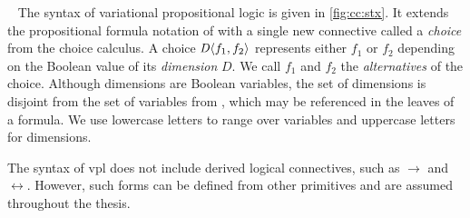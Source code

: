 ~\label{section:vpl:syntax}
%
The syntax of variational propositional logic is given in
\autoref{fig:cc:stx}. It extends the propositional formula notation of \pl{}
with a single new connective called a \emph{choice} from the choice calculus.
%
A choice $\chc[D]{f_1,f_2}$ represents either $f_1$ or $f_2$ depending on the
Boolean value of its \emph{dimension} $D$. We call $f_1$ and $f_2$ the
\emph{alternatives} of the choice.
%
Although dimensions are Boolean variables, the set of dimensions is disjoint
from the set of variables from \pl{}, which may be referenced in the leaves of
a formula. We use lowercase letters to range over variables and uppercase
letters for dimensions.

The syntax of \ac{vpl} does not include derived logical connectives, such as
$\rightarrow$ and $\leftrightarrow$. However, such forms can be defined
from other primitives and are assumed throughout the thesis.


